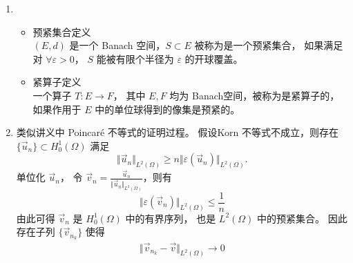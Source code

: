 \documentclass[a4paper]{article}
\begin{document}
\begin{enumerate}
\begin{itemize}
\begin{equation}
\begin{aligned}
                        \varepsilon(\vec{u})_{22} &= \frac{1}{2}(\partial_2 u_2 + \partial_2 u_2) = 0,\\
                        \varepsilon(\vec{u})_{12} &= \varepsilon(\vec{u})_{21} 
                        = \frac{1}{2}(\partial_1 u_2 + \partial_2 u_1)
                        = \frac{1}{2}(a - a) = 0.
                    \end{aligned}
                    \right.
                \end{equation}
                由此可知 $\varepsilon(\vec{u}) = O$.
        \end{itemize}
    \item[(b)]
        \begin{itemize}
            \item 预紧集合定义\\
                $(E,d)$ 是一个 Banach 空间，$S \subset  E$ 被称为是一个预紧集合，
                如果满足对 $\forall \varepsilon > 0$，
                $S$ 能被有限个半径为 $\varepsilon$ 的开球覆盖。
            \item 紧算子定义\\
                一个算子 $T: E \to F$，
                其中 $E,F$ 均为 Banach空间，被称为是紧算子的，
                如果作用于 $E$ 中的单位球得到的像集是预紧的。
        \end{itemize}
    \item[(c)] 类似讲义中 Poincaré 不等式的证明过程。
                假设Korn 不等式不成立，则存在 $\{ \vec{u}_n \} \subset H_0^1(\Omega)$ 满足
                \begin{equation}
                    \Vert \vec{u}_n \Vert_{L^2(\Omega)} \geq
                    n \Vert \varepsilon(\vec{u}_n) \Vert_{L^2(\Omega)}.
                \end{equation}
                单位化 $\vec{u}_n$，
                令 $\vec{v}_n = \frac{\vec{u}_n}{\Vert \vec{u}_n \Vert_{L^2(\Omega)}}$，则有
                \begin{equation}
                    \Vert \varepsilon(\vec{v}_n) \Vert_{L^2(\Omega)}
                    \leq \frac{1}{n} 
                \end{equation}
                由此可得 $\vec{v}_n$ 是 $H_0^1(\Omega)$ 中的有界序列，
                也是 $L^2(\Omega)$ 中的预紧集合。
                因此存在子列 $\{\vec{v}_{n_k}\}$
                使得 
                \begin{gather}
                    \Vert \vec{v}_{n_k} - \vec{v}\Vert_{L^2(\Omega)} \to 0\\

\end{gather}
\end{enumerate}
\end{document}
